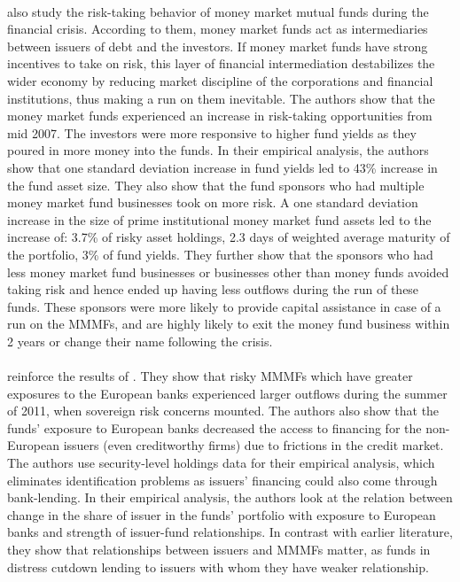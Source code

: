 \documentclass[11pt]{article}
\begin{document}
\paragraph{} \cite{kacperczyk2013safe} also study the risk-taking behavior of money market mutual funds during the financial crisis. According to them, money market funds act as intermediaries between issuers of debt and the investors. If money market funds have strong incentives to take on risk, this layer of financial intermediation destabilizes the wider economy by reducing market discipline of the corporations and financial institutions, thus making a run on them inevitable. The authors show that the money market funds experienced an increase in risk-taking opportunities from mid 2007. The investors were more responsive to higher fund yields as they poured in more money into the funds. In their empirical analysis, the authors show that one standard deviation increase in fund yields led to 43\% increase in the fund asset size. They also show that the fund sponsors who had multiple money market fund businesses took on more risk. A one standard deviation increase in the size of prime institutional money market fund assets led to the increase of: 3.7\% of risky asset holdings, 2.3 days of weighted average maturity of the portfolio, 3\% of fund yields. They further show that the sponsors who had less money market fund businesses or businesses other than money funds avoided taking risk and hence ended up having less outflows during the run of these funds. These sponsors were more likely to provide capital assistance in case of a run on the MMMFs, and are highly likely to exit the money fund business within 2 years or change their name following the crisis.

\paragraph{} \cite{chernenko2014frictions} reinforce the results of \cite{kacperczyk2013safe,strahan2015once}. They show that risky MMMFs which have greater exposures to the European banks experienced larger outflows during the summer of 2011, when sovereign risk concerns mounted. The authors also show that the funds’ exposure to European banks decreased the access to financing for the non-European issuers (even creditworthy firms) due to frictions in the credit market. The authors use security-level holdings data for their empirical analysis, which eliminates identification problems as issuers’ financing could also come through bank-lending. In their empirical analysis, the authors look at the relation between change in the share of issuer in the funds’ portfolio with exposure to European banks and strength of issuer-fund relationships. In contrast with earlier literature, they show that relationships between issuers and MMMFs matter, as funds in distress cutdown lending to issuers with whom they have weaker relationship. 
\end{document}
